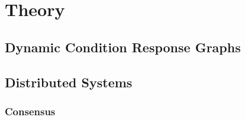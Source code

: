 \chapter{Theory}
	\section{Dynamic Condition Response Graphs}
	\section{Distributed Systems}
		\subsection{Consensus}